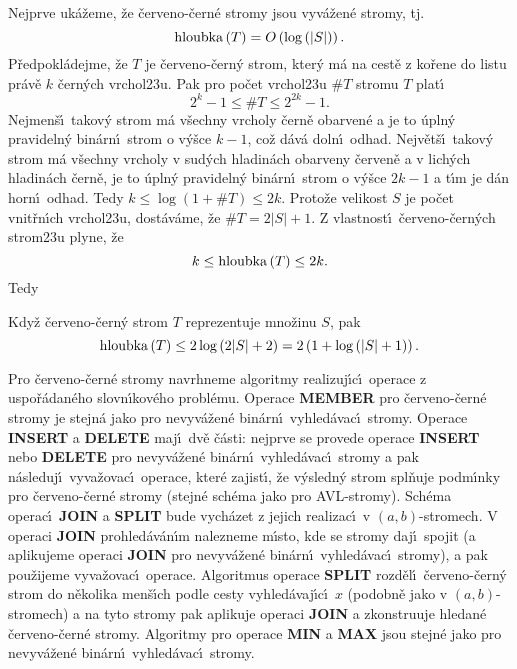 \flushpar Nejprve uk\'a\v zeme, \v ze \v cerveno-\v cern\'e stromy jsou 
vyv\'a\v zen\'e stro\-my, tj. $$\operatorname{hloubka}\left(T\right)=O\left(\log\left(|S|\right)\right).$$
P\v redpokl\'adejme, \v ze $T$ je \v cerveno-\v cern\'y strom, kter\'y m\'a 
na cest\v e z ko\v rene do listu pr\'av\v e $k$ \v cern\'ych 
vrchol\accent23u. Pak pro po\v cet vrchol\accent23u $\#T$ 
stromu $T$ plat\'\i\ 
$$2^k-1\le \#T\le 2^{2k}-1.$$
Nejmen\v s\'\i\ takov\'y strom m\'a v\v sechny vrcholy \v cern\v e 
obarven\'e a je to \'upln\'y pravideln\'y bin\'arn\'\i\ strom o 
v\'y\v sce $k-1$, co\v z d\'av\'a doln\'\i\ odhad.  Nejv\v et\v s\'\i\ takov\'y 
strom m\'a v\v sechny vrcholy v sud\'ych hladin\'ach obarveny 
\v cerven\v e a v lich\'ych hladin\'ach \v cern\v e, je to \'upln\'y 
pravideln\'y bin\'arn\'\i\ strom o v\'y\v sce $2k-1$ a t\'\i m je d\'an 
horn\'\i\ odhad. Tedy $k\le\log\left(1+\#T\right)\le 2k$.
Proto\v ze velikost $S$ je po\v cet vnit\v rn\'\i ch vrchol\accent23u, 
dost\'av\'ame, \v ze $\#T=2|S|+1$. Z vlastnost\'\i\ \v cerveno-\v cern\'ych 
strom\accent23u plyne, \v ze 
$$k\le\operatorname{hloubka}\left(T\right)\le 2k.$$
Tedy
\medskip

Kdy\v z \v cerveno-\v cern\'y strom $T$ 
reprezentuje mno\v zinu $S$, pak $$\operatorname{hloubka}\left(T\right)\le 2\log\left(2|S|+2\right)=2\left(1+\log\left(|S|+1\right)\right).$$
\endproclaim

\flushpar Pro \v cerveno-\v cern\'e stromy navrhneme algoritmy 
realizuj\'\i c\'\i\ ope\-race z uspo\v r\'adan\'eho slovn\'\i\-ko\-v\'eho probl\'emu.  
Operace {\bf MEMBER} pro \v cerveno-\v cern\'e stromy je stejn\'a jako pro 
nevyv\'a\v zen\'e bin\'arn\'\i\ vyhled\'avac\'\i\ stromy. Operace 
{\bf IN\-SERT} a {\bf DELETE} maj\'\i\ dv\v e \v c\'asti:  nejprve se provede 
ope\-race {\bf INSERT} nebo {\bf DELETE} pro nevyv\'a\v zen\'e bin\'arn\'\i\ 
vy\-hled\'avac\'\i\ stromy a pak n\'asleduj\'\i\ vyva\v zovac\'\i\ operace, kter\'e 
zajist\'\i , \v ze v\'ysledn\'y strom spl\v nuje pod\-m\'\i n\-ky pro \v cerveno-\v cern\'e 
stromy (stejn\'e sch\'ema jako pro AVL-stromy). Sch\'ema operac\'\i\ 
{\bf JOIN} a {\bf SPLIT} bude vych\'azet z jejich realizac\'\i\ v $
\left(a,b\right)$-stromech. 
V operaci {\bf JOIN} prohled\'av\'an\'\i m nalezneme m\'\i sto, kde se 
stromy  
daj\'\i\ spojit (a aplikujeme operaci {\bf JOIN} pro 
nevyv\'a\v zen\'e 
bin\'arn\'\i\ vyhled\'a\-va\-c\'\i\ stromy), a pak pou\v zijeme 
vyva\v zovac\'\i\ operace. Algoritmus ope\-race {\bf SPLIT} rozd\v el\'\i\ \v cerveno-\v cern\'y strom 
do n\v ekolika men\v s\'\i ch podle cesty vyhled\'avaj\'\i c\'\i\ $
x$ (podobn\v e jako 
v $\left(a,b\right)$-stromech) a na tyto stromy pak aplikuje operaci {\bf JOIN }
a zkonstruuje hledan\'e \v cerveno-\v cern\'e stromy. Algoritmy pro 
ope\-race {\bf MIN} a {\bf MAX} jsou stejn\'e jako pro nevyv\'a\v zen\'e bin\'arn\'\i\ 
vyhled\'avac\'\i\ stromy.
\medskip

